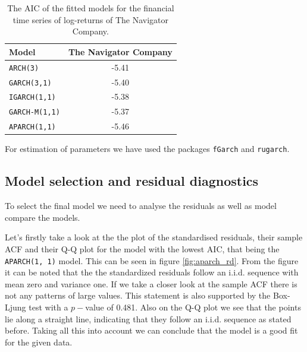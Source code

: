 \documentclass{article}
\begin{document}
\begin{table}[htbp]
    \centering
    \begin{tabular}{|l|c|} \hline
      \textbf{Model}  
      & \textbf{The Navigator Company} \\ \hline
      \verb|ARCH(3)|& -5.41  \\ \hline 
      \verb|GARCH(3,1)|  & -5.40  \\ \hline
      \verb|IGARCH(1,1)|  & -5.38  \\ \hline
      \verb|GARCH-M(1,1)|  &  -5.37  \\ \hline
      \verb|APARCH(1,1)|  & -5.46  \\  \hline
    \end{tabular}
    \caption{The AIC of the fitted models for the financial time series of log-returns
    of The Navigator Company.}
    \label{model:fs1}
\end{table}
  



For estimation of parameters we have used the packages \verb|fGarch| and \verb|rugarch|. 

\subsection{Model selection and residual diagnostics}

To select the final model we need to analyse  the residuals as well as model 
compare the models.

Let's firstly take a look at the the plot of the standardised residuals, their sample ACF and their Q-Q plot for the model with the lowest AIC, that being the \verb|APARCH(1, 1)| model. This can be seen in figure \ref{fig:aparch_rd}. From the figure it can be noted that the the standardized residuals follow an i.i.d. sequence with mean zero and variance one. If we take a closer look at the sample ACF there is not any patterns of large values. This statement is also supported by the Box-Ljung test with a $p-$value of 0.481.
Also on the Q-Q plot we see that the points lie along a straight line, indicating that they follow an i.i.d. sequence as stated before. Taking all this into account we can conclude that the model is a good fit for the given data.
\end{document}
